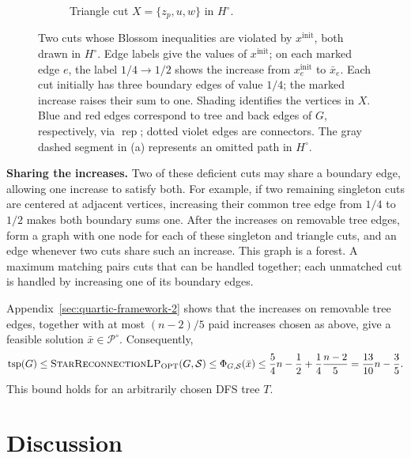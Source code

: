 \documentclass[11pt]{amsart}
\newcommand{\1}{\mathbbm{1}}
\newcommand{\LPtwo}{\textsc{StarReconnectionLP}}
\begin{document}
\begin{figure}[!t]
\begin{subfigure}[t]{.51\textwidth}
\caption{Triangle cut $X=\{z_p,u,w\}$ in $H^\circ$.}
\label{proc:fig-quartic-cuts}
\end{subfigure}

\caption{Two cuts whose Blossom inequalities are violated by
$x^{\mathrm{init}}$, both drawn in $H^\circ$.
Edge labels give the values of $x^{\mathrm{init}}$; on each
marked edge $e$, the label $1/4\to1/2$ shows the increase
from $x^{\mathrm{init}}_e$ to $\bar x_e$.
Each cut initially has three boundary edges of value $1/4$;
the marked increase raises their sum to one.
Shading identifies the vertices in $X$.
Blue and red edges correspond to tree and back edges of $G$,
respectively, via $\operatorname{rep}$; dotted violet edges are connectors.
The gray dashed segment in (a) represents an omitted path
in $H^\circ$.}
\label{proc:quartic-cut-configurations}
\end{figure}

\smallskip\noindent\textbf{Sharing the increases.}
{Two of these deficient cuts may share a boundary edge, allowing one
increase to satisfy both. For example, if two remaining singleton
cuts are centered at adjacent vertices, increasing their common
tree edge from $1/4$ to $1/2$ makes both boundary sums one.
After the increases on removable tree edges, form a graph with one node for each of these
singleton and triangle cuts, and an edge whenever two cuts share
such an increase.
This graph is a forest. A maximum matching pairs cuts that can be
handled together; each unmatched cut is handled by increasing one
of its boundary edges.}

Appendix~\ref{sec:quartic-framework-2} shows that the increases
on removable tree edges, together with at most $(n-2)/5$ paid
increases chosen as above, give a feasible solution
$\bar x\in{\mathcal P^\circ}$.
Consequently,
\[
 \operatorname{tsp}(G)\le\text{\LPtwo}_{\mathrm{OPT}}(G,\mathcal S)
 \le\Phi_{G,\mathcal S}(\bar x)
 \le\frac54n-\frac12+\frac14\frac{n-2}{5}
 =\frac{13}{10}n-\frac35.
\]
This bound holds for an arbitrarily chosen DFS tree $T$.

\section{Discussion}
\end{document}
